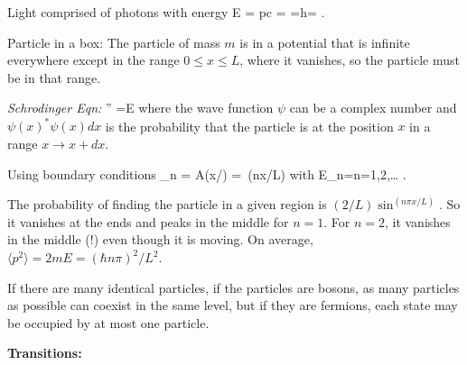 \documentclass[11pt]{book}
\begin{document}
\bei
\item
Light comprised of photons with energy
\be
E = pc =  =h\nu = \hbar\omega
.\ee
\item Particle in a box:
The particle of mass $m$ is in a potential that is infinite everywhere except in the range $0\le x\le L$, where it vanishes, so the particle must be in that range. 
\bee
\item {\it Schrodinger Eqn:}
\be
{} \psi'' =E\psi
\ee
where the wave function $\psi$ can be a complex number and $\psi(x)^*\psi(x) dx$ is the probability that the particle is at the position $x$ in a range $x\rightarrow x+dx$. 
\item
Using boundary conditions
\be
\psi_n = A\sin(x/\hbar) = \,\sin(n\pi x/L)
\ee
with 
\be
E_n=\qquad n=1,2,\ldots
.\ee
\item The probability of finding the particle in a given region is $(2/L) \sin^(n\pi x/L)$. So it vanishes at the ends and peaks in the middle for $n=1$. For $n=2$, it vanishes in the middle (!) even though it is moving. On average, $\langle p^2\rangle = 2mE = (\hbar n\pi)^2/L^2$.
\item If there are many identical particles, if the particles are bosons, as many particles as possible can coexist in the same level, but if they are fermions, each state may be occupied by at most one particle.
\eee
\eei


{\bf Transitions:}
\end{document}
